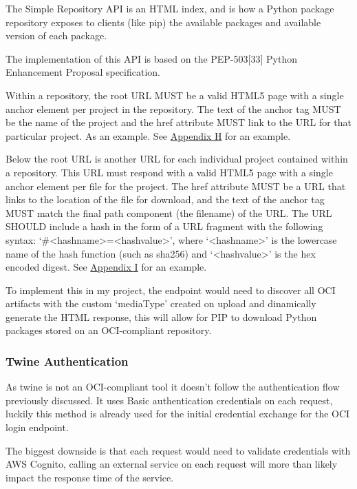 \documentclass{article}
\begin{document}
  The Simple Repository API is an HTML index, and is how a Python package repository exposes to clients (like pip) the available packages and available version of each package.

  The implementation of this API is based on the PEP-503[33] Python Enhancement Proposal specification.

  Within a repository, the root URL MUST be a valid HTML5 page with a single anchor element per project in the repository. The text of the anchor tag MUST be the name of the project and the href attribute MUST link to the URL for that particular project. As an example. See \hyperref[sec:appendix-h]{Appendix H} for an example.

  Below the root URL is another URL for each individual project contained within a repository. This URL must respond with a valid HTML5 page with a single anchor element per file for the project. The href attribute MUST be a URL that links to the location of the file for download, and the text of the anchor tag MUST match the final path component (the filename) of the URL. The URL SHOULD include a hash in the form of a URL fragment with the following syntax: `\#\textless{}hashname\textgreater{}=\textless{}hashvalue\textgreater', where `\textless{}hashname\textgreater' is the lowercase name of the hash function (such as sha256) and `\textless{}hashvalue\textgreater' is the hex encoded digest.
  See \hyperref[sec:appendix-i]{Appendix I} for an example.

  To implement this in my project, the endpoint would need to discover all OCI artifacts with the custom `mediaType' created on upload and dinamically generate the HTML response, this will allow for PIP to download Python packages stored on an OCI-compliant repository.

  \subsubsection{Twine Authentication}

  As twine is not an OCI-compliant tool it doesn't follow the authentication flow previously discussed. It uses Basic authentication credentials on each request, luckily this method is already used for the initial credential exchange for the OCI login endpoint.

  The biggest downside is that each request would need to validate credentials with AWS Cognito, calling an external service on each request will more than likely impact the 
  response time of the service.
\end{document}
